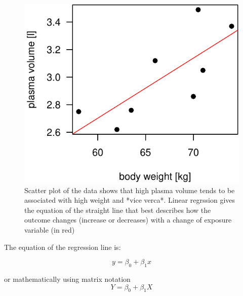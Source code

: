 \documentclass[]{article}
\begin{document}
\begin{figure}[H]

{\centering \includegraphics{session-regression-I-files/figures/fig-intro-example-reg-1} 

}

\caption{Scatter plot of the data shows that high plasma volume tends to be associated with high weight and *vice verca*. Linear regrssion gives the equation of the straight line that best describes how the outcome changes (increase or decreases) with a change of exposure variable (in red)}\label{fig:fig-intro-example-reg}
\end{figure}

The equation of the regression line is:

\[y=\beta_0 + \beta_1x\]

or mathematically using matrix notation \[Y=\beta_0 + \beta_1X\]
\end{document}
